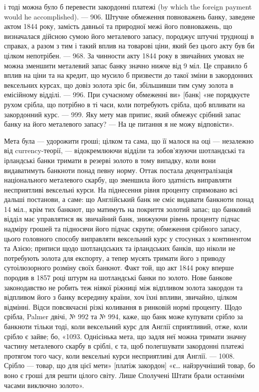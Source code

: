 \parcont{}  %
і тоді можна було б перевести закордонні платежі (by which the foreign payment
would he accomplished). — 906. Штучне обмеження повноважень банку, заведене
актом 1844 року, замість давньої та природної межі його повноважень, що визначалася
дійсною сумою його металевого запасу, породжує штучні труднощі в
справах, а разом з тим і такий вплив на товарові ціни, який без цього акту
був би цілком непотрібен. — 968. За чинности акту 1844 року в звичайних
умовах не можна зменшити металевий запас банку значно нижче від 9 міл.
Це справило б вплив на ціни та на кредит, що мусило б призвести до такої
зміни в закордонних вексельних курсах, що довіз золота зріс би, збільшивши
тим суму золота в емісійному відділі. — 996. При сучасному обмеженні ви»
[банк] «не порядкуєте рухом срібла, що потрібно в ті часи, коли потребують
срібла, щоб впливати на закордонний курс. — 999. Яку мету мав припис, який
обмежує срібний запас банку на  його металевого запасу? — На це питання
я не можу відповісти».

Мета була — удорожити гроші; цілком та сама, що її малося на оці —
незалежно від currency-теорії, — відокремлюючи відділи та зобов’язуючи шотландські
та ірландські банки тримати в резерві золото в тому випадку, коли
вони видаватимуть банкноти понад певну норму. Оттак постала децентралізація
національного металевого скарбу, що зменшила його здатність виправляти несприятливі
вексельні курси. На піднесення рівня проценту спрямовано всі дальші
постанови, а саме: що Англійський банк не сміє видавати банкноти понад 14 міл.,
крім тих банкнот, що матимуть на покриття золотий запас; що банковий відділ має
управлятися як звичайний банк, знижуючи рівень проценту підчас надміру
грошей та підносячи його підчас скрути; обмеження срібного запасу, цього
головного способу виправляти вексельний курс у стосунках з континентом та
Азією; приписи щодо шотландських та ірландських банків, що ніколи не потребують
золота для експорту, а тепер мусять тримати його з приводу сутоілюзорного
розміну своїх банкнот. Факт той, що акт 1844 року вперше породив
в 1857 році штурм на шотландські банки по золото. Нове банкове
законодавство не робить теж ніякої ріжниці між відпливом золота закордон та
відпливом його з банку всередину країни, хоч їхні впливи, звичайно, цілком
відмінні. Відси повсякчасні різкі коливання в ринковій нормі проценту. Щодо
срібла, Palmer двічі, № 992 та № 994, каже, що банк може купувати срібло
за банкноти тільки тоді, коли вексельний курс для Англії сприятливий, отже,
коли срібло є зайве; бо, «1093. Однісінька мета, що задля неї можна тримати
значну частину металевого скарбу в сріблі, є та, щоб полегшувати закордонні
платежі протягом того часу, коли вексельні курси несприятливі для Англії. —
1008. Срібло — товар, що для цієї мети» [платіж закордон] «є\dots{} найзручніший
товар, бо воно є гроші для решти цілого світу. Лише Сполучені Штати брали
останніми часами виключно золото».

